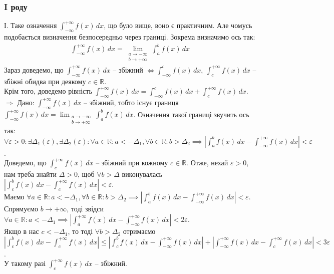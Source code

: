 \documentclass[a4paper, 10pt]{article}
\def\rightproof{$\boxed{\Rightarrow}$ }
\theoremstyle{theoremdd}
\theoremstyle{theoremdd}
\theoremstyle{theoremdd}
\theoremstyle{theoremdd}
\theoremstyle{theoremdd}
\theoremstyle{theoremdd}
\theoremstyle{theoremdd}
\theoremstyle{theoremdd}
\theoremstyle{theoremdd}
\begin{document}
\subsubsection*{I роду}
І. Таке означення $\displaystyle\int_{-\infty}^{+\infty} f(x)\,dx$, що було вище, воно є практичним. Але чомусь подобається визначення безпосередньо через границі. Зокрема визначимо ось так:
\begin{align*}
\int_{-\infty}^{+\infty} f(x)\,dx = \lim_{\substack{a \to -\infty \\ b \to + \infty}} \int_a^b f(x)\,dx
\end{align*}
Зараз доведемо, що $\displaystyle\int_{-\infty}^{+\infty} f(x)\,dx$ -- збіжний $\iff \displaystyle\int_{-\infty}^c f(x)\,dx,\ \int_c^{+\infty} f(x)\,dx$ -- збіжні обидва при деякому $c \in \mathbb{R}$.\\
Крім того, доведемо рівність $\displaystyle\int_{-\infty}^{+\infty} f(x)\,dx = \int_{-\infty}^c f(x)\,dx + \int_c^{+\infty} f(x)\,dx$.
\bigskip \\
\rightproof Дано: $\displaystyle\int_{-\infty}^{+\infty} f(x)\,dx$ -- збіжний, тобто існує границя $\displaystyle\int_{-\infty}^{+\infty} f(x)\,dx = \lim_{\substack{a \to -\infty \\ b \to + \infty}} \int_a^b f(x)\,dx$. Означення такої границі звучить ось так: $\forall \varepsilon > 0: \exists \Delta_1(\varepsilon), \exists \Delta_2(\varepsilon): \forall a \in \mathbb{R}: a < -\Delta_1, \forall b \in \mathbb{R}: b > \Delta_2 \implies \displaystyle \left| \int_a^b f(x)\,dx - \int_{-\infty}^{+\infty} f(x)\,dx \right| < \varepsilon$.\\
Доведемо, що $\displaystyle\int_c^{+\infty} f(x)\,dx$ -- збіжний при кожному $c \in \mathbb{R}$. Отже, нехай $\varepsilon > 0$, нам треба знайти $\Delta > 0$, щоб $\forall b > \Delta$ виконувалась $\displaystyle\left| \int_c^b f(x)\,dx - \int_c^{+\infty} f(x)\,dx \right| < \varepsilon$.\\
Маємо $\forall a \in \mathbb{R}: a < -\Delta_1, \forall b \in \mathbb{R}: b > \Delta_2 \implies \displaystyle \left| \int_a^b f(x)\,dx - \int_{-\infty}^{+\infty} f(x)\,dx \right| < \varepsilon$. Спрямуємо $b \to +\infty$, тоді звідси $\forall a \in \mathbb{R}: a < -\Delta_1 \implies \displaystyle \left| \int_a^{+\infty} f(x)\,dx - \int_{-\infty}^{+\infty} f(x)\,dx \right| < 2\varepsilon$.\\
Якщо в нас $c < -\Delta_1$, то тоді $\forall b > \Delta_2$ отримаємо\\
$\displaystyle\left| \int_c^b f(x)\,dx - \int_c^{+\infty} f(x)\,dx \right| \leq \left| \int_c^b f(x)\,dx - \int_{-\infty}^{+\infty} f(x)\,dx \right| + \left| \int_{-\infty}^{+\infty} f(x)\,dx - \int_c^{+\infty} f(x)\,dx \right| < 3\varepsilon$.\\
У такому разі $\displaystyle\int_{c}^{+\infty} f(x)\,dx$ -- збіжний.\\
\end{document}
